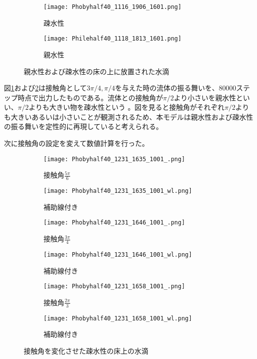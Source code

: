 \documentclass[]{jsarticle}
\begin{document}
\begin{figure}[H]
  \centering
  \begin{subfigure}{0.8\columnwidth}
    \centering
    \texttt{[image: Phobyhalf40\_1116\_1906\_1601.png]}
    \caption{疎水性}
    \label{fig:PhobyDrop}
  \end{subfigure}
  \begin{subfigure}{0.8\columnwidth}
    \centering
    \texttt{[image: Philehalf40\_1118\_1813\_1601.png]}
    \caption{親水性}
    \label{fig:PhileDrop}
  \end{subfigure}
  \caption{親水性および疎水性の床の上に放置された水滴}
  \label{fig:contactAngles}
\end{figure}

図\ref{fig:PhobyDrop}および\ref{fig:PhileDrop}は接触角として$3\pi/4, \pi/4$を与えた時の流体の振る舞いを、80000ステップ時点で出力したものである。流体との接触角が$\pi/2$より小さいを親水性といい、$\pi/2$よりも大きい物を疎水性という \cite{Truscott2012}。図を見ると接触角がそれぞれ$\pi/2$よりも大きいあるいは小さいことが観測されるため、本モデルは親水性および疎水性の振る舞いを定性的に再現していると考えられる。

次に接触角の設定を変えて数値計算を行った。
\begin{figure}[H]
  \centering
  \begin{subfigure}{0.4\columnwidth}
    \centering
    \texttt{[image: Phobyhalf40\_1231\_1635\_1001\_.png]}
    \caption{接触角$\frac{5\pi}{6}$}
    \label{fig:phoby_pi6}
  \end{subfigure}
  \begin{subfigure}{0.4\columnwidth}
    \centering
    \texttt{[image: Phobyhalf40\_1231\_1635\_1001\_wl.png]}
    \caption{補助線付き}
    \label{fig:phoby_pi6wl}
  \end{subfigure}

  \begin{subfigure}{0.4\columnwidth}
    \centering
    \texttt{[image: Phobyhalf40\_1231\_1646\_1001\_.png]}
    \caption{接触角$\frac{3\pi}{4}$}
    \label{fig:phoby_pi4}
  \end{subfigure}
  \begin{subfigure}{0.4\columnwidth}
    \centering
    \texttt{[image: Phobyhalf40\_1231\_1646\_1001\_wl.png]}
    \caption{補助線付き}
    \label{fig:phoby_pi4wl}
  \end{subfigure}
  \begin{subfigure}{0.4\columnwidth}
    \centering
    \texttt{[image: Phobyhalf40\_1231\_1658\_1001\_.png]}
    \caption{接触角$\frac{2\pi}{3}$}
    \label{fig:phoby_pi3}
  \end{subfigure}
  \begin{subfigure}{0.4\columnwidth}
    \centering
    \texttt{[image: Phobyhalf40\_1231\_1658\_1001\_wl.png]}
    \caption{補助線付き}
    \label{fig:phoby_pi3wl}
  \end{subfigure}

  \caption{接触角を変化させた疎水性の床上の水滴}
\end{figure}
\end{document}
